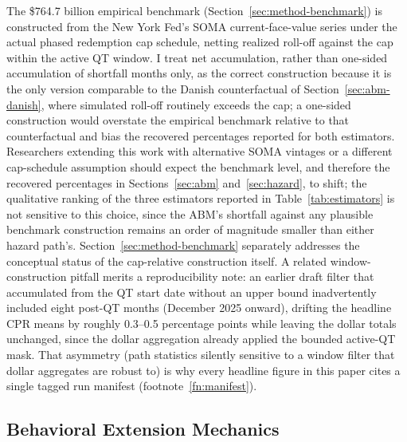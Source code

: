 \documentclass[12pt]{article}
\begin{document}
The \$764.7 billion empirical benchmark (Section~\ref{sec:method-benchmark}) is constructed from the New York Fed's SOMA current-face-value series under the actual phased redemption cap schedule, netting realized roll-off against the cap within the active QT window. I treat net accumulation, rather than one-sided accumulation of shortfall months only, as the correct construction because it is the only version comparable to the Danish counterfactual of Section~\ref{sec:abm-danish}, where simulated roll-off routinely exceeds the cap; a one-sided construction would overstate the empirical benchmark relative to that counterfactual and bias the recovered percentages reported for both estimators. Researchers extending this work with alternative SOMA vintages or a different cap-schedule assumption should expect the benchmark level, and therefore the recovered percentages in Sections~\ref{sec:abm} and~\ref{sec:hazard}, to shift; the qualitative ranking of the three estimators reported in Table~\ref{tab:estimators} is not sensitive to this choice, since the ABM's shortfall against any plausible benchmark construction remains an order of magnitude smaller than either hazard path's. Section~\ref{sec:method-benchmark} separately addresses the conceptual status of the cap-relative construction itself. A related window-construction pitfall merits a reproducibility note: an earlier draft filter that accumulated from the QT start date without an upper bound inadvertently included eight post-QT months (December 2025 onward), drifting the headline CPR means by roughly 0.3--0.5 percentage points while leaving the dollar totals unchanged, since the dollar aggregation already applied the bounded active-QT mask. That asymmetry (path statistics silently sensitive to a window filter that dollar aggregates are robust to) is why every headline figure in this paper cites a single tagged run manifest (footnote~\ref{fn:manifest}).

\subsection{Behavioral Extension Mechanics}\label{sec:robustness-extensions}
\end{document}
